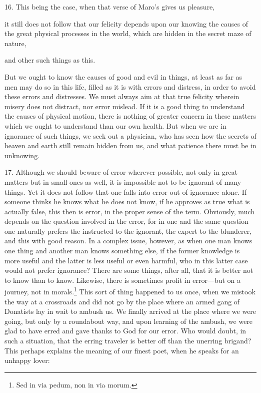 
16. This being the case, when that verse of Maro's gives us pleasure,

it still does not follow that our felicity depends upon our knowing the causes of the great physical processes in the world, which are hidden in the secret maze of nature,

and other such things as this.

But we ought to know the causes of good and evil in things, at least as far as men may do so in this life, filled as it is with errors and distress, in order to avoid these errors and distresses. We must always aim at that true felicity wherein misery does not distract, nor error mislead. If it is a good thing to understand the causes of physical motion, there is nothing of greater concern in these matters which we ought to understand than our own health. But when we are in ignorance of such things, we seek out a physician, who has seen how the secrets of heaven and earth still remain hidden from us, and what patience there must be in unknowing.

17. Although we should beware of error wherever possible, not only in great matters but in small ones as well, it is impossible not to be ignorant of many things. Yet it does not follow that one falls into error out of ignorance alone. If someone thinks he knows what he does not know, if he approves as true what is actually false, this then is error, in the proper sense of the term. Obviously, much depends on the question involved in the error, for in one and the same question one naturally prefers the instructed to the ignorant, the expert to the blunderer, and this with good reason. In a complex issue, however, as when one man knows one thing and another man knows something else, if the former knowledge is more useful and the latter is less useful or even harmful, who in this latter case would not prefer ignorance? There are some things, after all, that it is better not to know than to know. Likewise, there is sometimes profit in error—but on a journey, not in morals.\footnote{Sed in via pedum, non in via morum.} This sort of thing happened to us once, when we mistook the way at a crossroads and did not go by the place where an armed gang of Donatists lay in wait to ambush us. We finally arrived at the place where we were going, but only by a roundabout way, and upon learning of the ambush, we were glad to have erred and gave thanks to God for our error. Who would doubt, in such a situation, that the erring traveler is better off than the unerring brigand? This perhaps explains the meaning of our finest poet, when he speaks for an unhappy lover:

